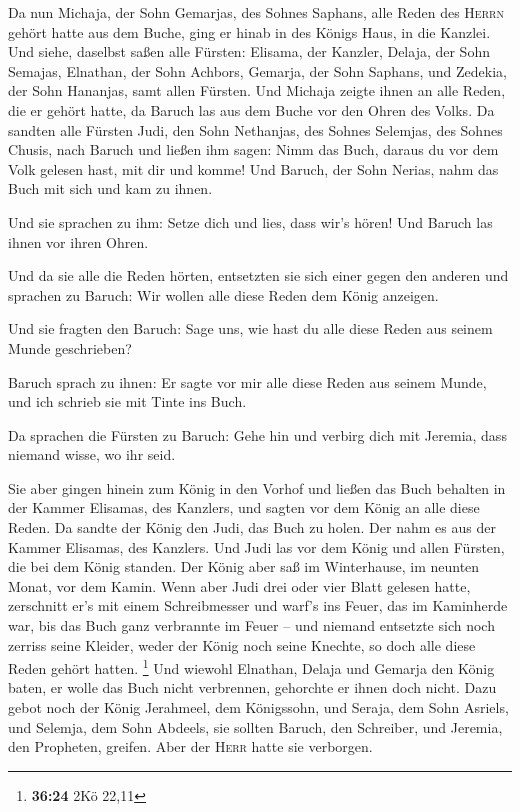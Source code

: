  Da nun Michaja, der Sohn Gemarjas, des Sohnes Saphans,
alle Reden des \textsc{Herrn} gehört hatte aus dem Buche,
 ging er hinab in des Königs Haus, in die Kanzlei. Und
siehe, daselbst saßen alle Fürsten: Elisama, der Kanzler, Delaja, der
Sohn Semajas, Elnathan, der Sohn Achbors, Gemarja, der Sohn Saphans, und
Zedekia, der Sohn Hananjas, samt allen Fürsten.  Und
Michaja zeigte ihnen an alle Reden, die er gehört hatte, da Baruch las
aus dem Buche vor den Ohren des Volks.  Da sandten alle
Fürsten Judi, den Sohn Nethanjas, des Sohnes Selemjas, des Sohnes
Chusis, nach Baruch und ließen ihm sagen: Nimm das Buch, daraus du vor
dem Volk gelesen hast, mit dir und komme! Und Baruch, der Sohn Nerias,
nahm das Buch mit sich und kam zu ihnen.

 Und sie sprachen zu ihm: Setze dich und lies, dass wir's
hören! Und Baruch las ihnen vor ihren Ohren.

 Und da sie alle die Reden hörten, entsetzten sie sich
einer gegen den anderen und sprachen zu Baruch: Wir wollen alle diese
Reden dem König anzeigen.

 Und sie fragten den Baruch: Sage uns, wie hast du alle
diese Reden aus seinem Munde geschrieben?

 Baruch sprach zu ihnen: Er sagte vor mir alle diese
Reden aus seinem Munde, und ich schrieb sie mit Tinte ins Buch.

 Da sprachen die Fürsten zu Baruch: Gehe hin und verbirg
dich mit Jeremia, dass niemand wisse, wo ihr seid.

 Sie aber gingen hinein zum König in den Vorhof und
ließen das Buch behalten in der Kammer Elisamas, des Kanzlers, und
sagten vor dem König an alle diese Reden.  Da sandte der
König den Judi, das Buch zu holen. Der nahm es aus der Kammer Elisamas,
des Kanzlers. Und Judi las vor dem König und allen Fürsten, die bei dem
König standen.  Der König aber saß im Winterhause, im
neunten Monat, vor dem Kamin.  Wenn aber Judi drei oder
vier Blatt gelesen hatte, zerschnitt er's mit einem Schreibmesser und
warf's ins Feuer, das im Kaminherde war, bis das Buch ganz verbrannte im
Feuer --  und niemand entsetzte sich noch zerriss seine
Kleider, weder der König noch seine Knechte, so doch alle diese Reden
gehört hatten. \footnote{\textbf{36:24} 2Kö 22,11}  Und
wiewohl Elnathan, Delaja und Gemarja den König baten, er wolle das Buch
nicht verbrennen, gehorchte er ihnen doch nicht.  Dazu
gebot noch der König Jerahmeel, dem Königssohn, und Seraja, dem Sohn
Asriels, und Selemja, dem Sohn Abdeels, sie sollten Baruch, den
Schreiber, und Jeremia, den Propheten, greifen. Aber der \textsc{Herr}
hatte sie verborgen.

